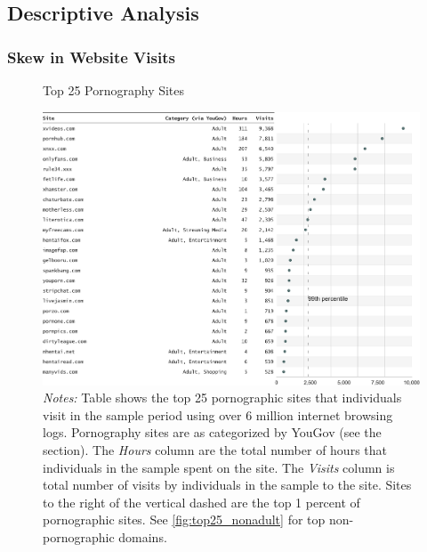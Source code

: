 \documentclass[12pt, letterpaper]{article}
\begin{document}
\FloatBarrier
\subsection{Descriptive Analysis}

\subsubsection{Skew in Website Visits}
\begin{figure}[ht]
	\centering
	\caption{Top 25 Pornography Sites}
	\includegraphics[width=\textwidth]{../figs/top_25_adultsites.pdf}
	\caption*{\footnotesize \emph{Notes:} 
		Table shows the top 25 pornographic sites that individuals visit in the sample period using over 6 million internet browsing logs.
		Pornography sites are as categorized by YouGov (see the  section).
		The \emph{Hours} column are the total number of hours that individuals in the sample spent on the site. 
		The \emph{Visits} column is total number of visits by individuals in the sample to the site.  
		Sites to the right of the vertical dashed are the top 1 percent of pornographic sites.
		See \cref{fig:top25_nonadult} for top non-pornographic domains.
	}
	\label{fig:top25_adult}
\end{figure}
\end{document}
